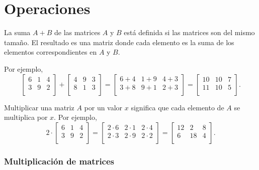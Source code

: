\section{Operaciones}

La suma $A+B$ de las matrices $A$ y $B$
está definida si las matrices son del mismo tamaño.
El resultado es una matriz donde cada elemento
es la suma de los elementos correspondientes
en $A$ y $B$.

Por ejemplo,
\[
 \begin{bmatrix}
  6 & 1 & 4 \\
  3 & 9 & 2 \\
 \end{bmatrix}
+
 \begin{bmatrix}
  4 & 9 & 3 \\
  8 & 1 & 3 \\
 \end{bmatrix}
=
 \begin{bmatrix}
  6+4 & 1+9 & 4+3 \\
  3+8 & 9+1 & 2+3 \\
 \end{bmatrix}
=
 \begin{bmatrix}
  10 & 10 & 7 \\
  11 & 10 & 5 \\
 \end{bmatrix}.
\]

Multiplicar una matriz $A$ por un valor $x$ significa
que cada elemento de $A$ se multiplica por $x$.
Por ejemplo,
\[
 2 \cdot \begin{bmatrix}
  6 & 1 & 4 \\
  3 & 9 & 2 \\
 \end{bmatrix}
=
 \begin{bmatrix}
  2 \cdot 6 & 2\cdot1 & 2\cdot4 \\
  2\cdot3 & 2\cdot9 & 2\cdot2 \\
 \end{bmatrix}
=
 \begin{bmatrix}
  12 & 2 & 8 \\
  6 & 18 & 4 \\
 \end{bmatrix}.
\]

\subsubsection{Multiplicación de matrices}



